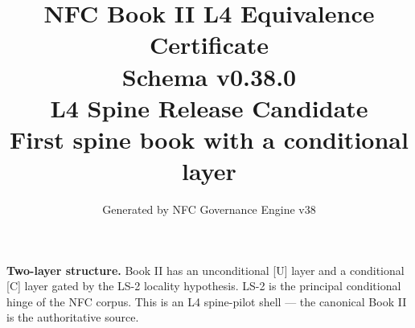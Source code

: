 \documentclass[11pt]{article}
\title{NFC Book II L4 Equivalence Certificate\\[1ex]\large Schema v0.38.0\\[0.5ex]
\normalsize L4 Spine Release Candidate\\[0.5ex]
\small First spine book with a conditional layer}
\author{Generated by NFC Governance Engine v38}
\date{}
\begin{document}
\maketitle
\tableofcontents
\bigskip
\noindent\textbf{Two-layer structure.} Book II has an unconditional [U] layer
and a conditional [C] layer gated by the LS-2 locality hypothesis.
LS-2 is the principal conditional hinge of the NFC corpus.
This is an L4 spine-pilot shell --- the canonical Book II is the authoritative source.
\vspace{1em}

\end{document}
